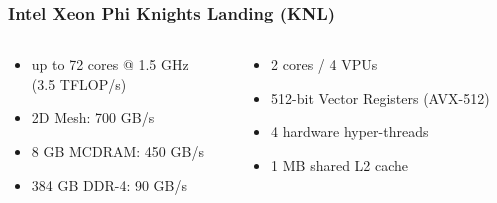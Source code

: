\documentclass{beamer}
\begin{document}
  \begin{frame}
    \frametitle{Intel Xeon Phi Knights Landing (KNL)}
    \vspace{-7mm}

    \begin{columns}[T]
      \begin{column}{.5\textwidth}
        \begin{center}
        \end{center}
      \end{column}
      \begin{column}{.5\textwidth}
        \begin{center}
        \end{center}
      \end{column}
    \end{columns}
    \vspace{3mm}

    \begin{columns}[T]
      \begin{column}{.5\textwidth}
        \begin{itemize}
          \item up to 72 cores @ 1.5 GHz\\ (3.5 TFLOP/s)
          \item 2D Mesh: 700 GB/s
          \item 8 GB MCDRAM: 450 GB/s
          \item 384 GB DDR-4: 90 GB/s
        \end{itemize}
      \end{column}
      \begin{column}{.5\textwidth}
        \begin{itemize}
          \item 2 cores / 4 VPUs
          \item 512-bit Vector Registers (AVX-512)
          \item 4 hardware hyper-threads
          \item 1 MB shared L2 cache
        \end{itemize}
      \end{column}
    \end{columns}

  \end{frame}

\end{document}
